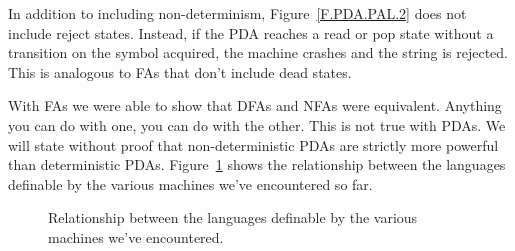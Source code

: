 \documentclass[letterpaper,12pt,openany,reqno]{book}%
\begin{document}
In addition to including non-determinism, Figure~\ref{F.PDA.PAL.2} does not include reject states. Instead, if the PDA reaches a read or pop state without a transition on the symbol acquired, the machine crashes and the string is rejected. This is analogous to FAs that don't include dead states. 

With FAs we were able to show that DFAs and NFAs were equivalent. Anything you can do with one, you can do with the other. This is not true with PDAs. We will state without proof that non-deterministic PDAs are strictly more powerful than deterministic PDAs. Figure~\ref{F.machine.sizes.1} shows the relationship between the languages definable by the various machines we've encountered so far.
\begin{figure}[htbp]
\centering
{} %
\caption{Relationship between the languages definable by the various machines we've encountered.}
\label{F.machine.sizes.1}
\end{figure}
\end{document}
